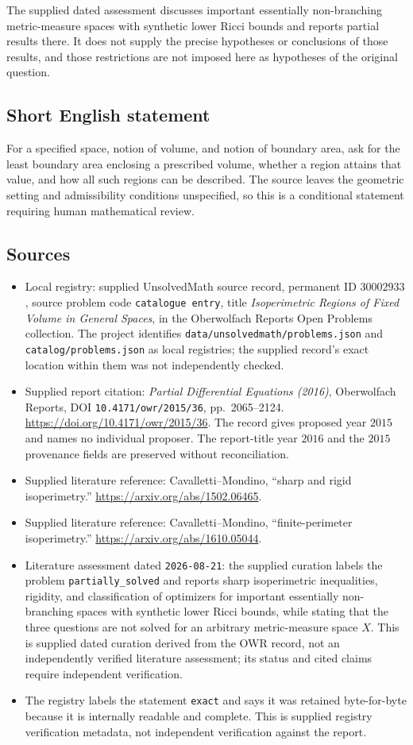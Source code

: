 \documentclass[11pt]{article}
\begin{document}
The supplied dated assessment discusses important essentially non-branching metric-measure spaces with synthetic lower Ricci bounds and reports partial results there. It does not supply the precise hypotheses or conclusions of those results, and those restrictions are not imposed here as hypotheses of the original question.
\subsection{Short English statement}
For a specified space, notion of volume, and notion of boundary area, ask for the least boundary area enclosing a prescribed volume, whether a region attains that value, and how all such regions can be described. The source leaves the geometric setting and admissibility conditions unspecified, so this is a conditional statement requiring human mathematical review.
\subsection{Sources}
\begin{itemize}
\item Local registry: supplied UnsolvedMath source record, permanent ID \(30002933\), source problem code \texttt{catalogue entry}, title \emph{Isoperimetric Regions of Fixed Volume in General Spaces}, in the Oberwolfach Reports Open Problems collection. The project identifies \texttt{data/unsolvedmath/problems.json} and \texttt{catalog/problems.json} as local registries; the supplied record's exact location within them was not independently checked.
\item Supplied report citation: \emph{Partial Differential Equations (2016)}, Oberwolfach Reports, DOI \texttt{10.4171/owr/2015/36}, pp.\ 2065--2124. \url{https://doi.org/10.4171/owr/2015/36}. The record gives proposed year \(2015\) and names no individual proposer. The report-title year \(2016\) and the \(2015\) provenance fields are preserved without reconciliation.
\item Supplied literature reference: Cavalletti--Mondino, ``sharp and rigid isoperimetry.'' \url{https://arxiv.org/abs/1502.06465}.
\item Supplied literature reference: Cavalletti--Mondino, ``finite-perimeter isoperimetry.'' \url{https://arxiv.org/abs/1610.05044}.
\item Literature assessment dated \texttt{2026-08-21}: the supplied curation labels the problem \texttt{partially\_solved} and reports sharp isoperimetric inequalities, rigidity, and classification of optimizers for important essentially non-branching spaces with synthetic lower Ricci bounds, while stating that the three questions are not solved for an arbitrary metric-measure space \(X\). This is supplied dated curation derived from the OWR record, not an independently verified literature assessment; its status and cited claims require independent verification.
\item The registry labels the statement \texttt{exact} and says it was retained byte-for-byte because it is internally readable and complete. This is supplied registry verification metadata, not independent verification against the report.
\end{itemize}
\end{document}
